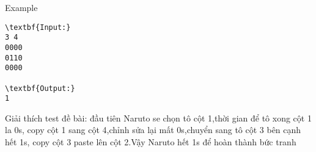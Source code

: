 Example
\begin{verbatim}
\textbf{Input:}
3 4
0000
0110
0000

\textbf{Output:}
1
\end{verbatim}

   Giải thích test đề bài: đầu tiên Naruto se chọn tô cột 1,thời gian để tô xong cột 1 la 0s, copy cột 1 sang cột 4,chỉnh sửa lại mất 0s,chuyển sang tô cột 3 bên cạnh hết 1s, copy cột 3 paste lên cột 2.Vậy Naruto hết 1s để hoàn thành bức tranh